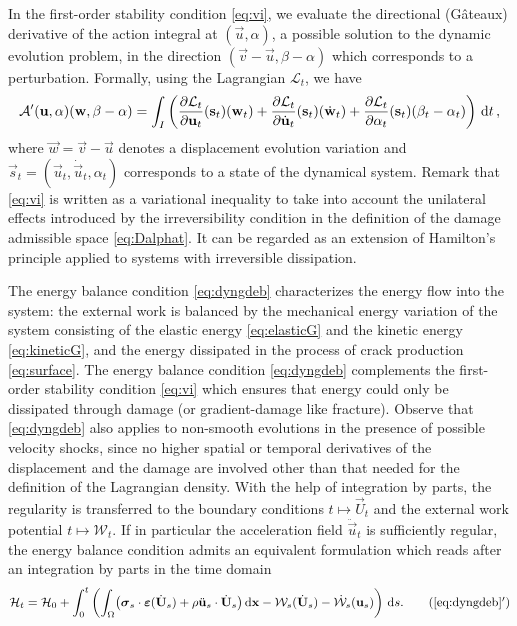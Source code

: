 In the first-order stability condition \eqref{eq:vi}, we evaluate the directional (Gâteaux) derivative of the action integral at $(\vec{u},\alpha)$, a possible solution to the dynamic evolution problem, in the direction $(\vec{v}-\vec{u},\beta-\alpha)$ which corresponds to a perturbation. Formally, using the Lagrangian $\mathcal{L}_t$, we have
\[
\mathcal{A}'(\vec{u},\alpha)(\vec{w},\beta-\alpha)=\int_I\left(\frac{\partial \mathcal{L}_t}{\partial\vec{u}_t}(\vec{s}_t)(\vec{w}_t)+\frac{\partial \mathcal{L}_t}{\partial\dot{\vec{u}}_t}(\vec{s}_t)(\dot{\vec{w}}_t)+\frac{\partial \mathcal{L}_t}{\partial\alpha_t}(\vec{s}_t)(\beta_t-\alpha_t)\right)\D{t}\,,
\]
where $\vec{w}=\vec{v}-\vec{u}$ denotes a displacement evolution variation and $\vec{s}_t=(\vec{u}_t,\dot{\vec{u}}_t,\alpha_t)$ corresponds to a state of the dynamical system. Remark that \eqref{eq:vi} is written as a variational inequality to take into account the unilateral effects introduced by the irreversibility condition in the definition of the damage admissible space \eqref{eq:Dalphat}. It can be regarded as an extension of Hamilton's principle applied to systems with irreversible dissipation.

The energy balance condition \eqref{eq:dyngdeb} characterizes the energy flow into the system: the external work is balanced by the mechanical energy variation of the system consisting of the elastic energy \eqref{eq:elasticG} and the kinetic energy \eqref{eq:kineticG}, and the energy dissipated in the process of crack production \eqref{eq:surface}. The energy balance condition \eqref{eq:dyngdeb} complements the first-order stability condition \eqref{eq:vi} which ensures that energy could only be dissipated through damage (or gradient-damage like fracture). Observe that \eqref{eq:dyngdeb} also applies to non-smooth evolutions in the presence of possible velocity shocks, since no higher spatial or temporal derivatives of the displacement and the damage are involved other than that needed for the definition of the Lagrangian density. With the help of integration by parts, the regularity is transferred to the boundary conditions $t\mapsto \vec{U}_t$ and the external work potential $t\mapsto \mathcal{W}_t$. If in particular the acceleration field $\ddot{\vec{u}}_t$ is sufficiently regular, the energy balance condition admits an equivalent formulation which reads after an integration by parts in the time domain
\begin{align} \label{eq:dyngdeb2}
\mathcal{H}_t=\mathcal{H}_0+\int_0^t\left(\int_\Omega\bigl(\sig_s\cdot\eps(\dot{\vec{U}}_s)+\rho\ddot{\vec{u}}_s\cdot\dot{\vec{U}}_s\bigr)\dx-\mathcal{W}_s(\dot{\vec{U}}_s)-\dot{\mathcal{W}}_s(\vec{u}_s)\right)\D{s}. \tag{\ref*{eq:dyngdeb}${}^\prime$}
\end{align}

